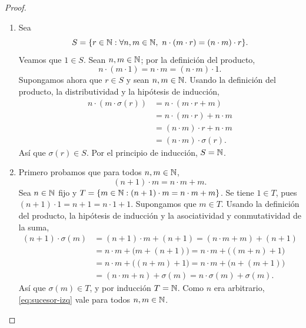 \documentclass[12pt,a4paper]{article}
\begin{document}
    \begin{proof}
        \begin{enumerate}
            \item[a)] Sea
            \begin{equation*}
                S=\{r\in\N : \forall n,m\in\N,\ n\cdot(m\cdot r)=(n\cdot m)\cdot r\}.
            \end{equation*}
            Veamos que $1\in S$. Sean $n,m\in\mathbb{N}$; por la definición del producto,
            \begin{equation*}
                n\cdot(m\cdot1)=n\cdot m=(n\cdot m)\cdot1.
            \end{equation*}
            Supongamos ahora que $r\in S$ y sean $n,m\in\mathbb{N}$. Usando la definición del producto, la distributividad
            y la hipótesis de inducción,
            \begin{align*}
                n\cdot(m\cdot\sigma(r)) &= n\cdot(m\cdot r+m) \\
                &= n\cdot(m\cdot r)+n\cdot m \\
                &= (n\cdot m)\cdot r+n\cdot m \\
                &= (n\cdot m)\cdot\sigma(r).
            \end{align*}
            Así que $\sigma(r)\in S$. Por el principio de inducción, $S=\mathbb{N}$.

            \item[b)] Primero probamos que para todos $n,m\in\mathbb{N}$,
            \begin{equation}\label{eq:sucesor-izq}
                (n+1)\cdot m=n\cdot m+m.
            \end{equation}
            Sea $n\in\mathbb{N}$ fijo y $T=\{m\in\mathbb{N} : (n+1)\cdot m=n\cdot m+m\}$. Se tiene $1\in T$, pues
            $(n+1)\cdot1=n+1=n\cdot1+1$. Supongamos que $m\in T$. Usando la definición del producto, la hipótesis
            de inducción y la asociatividad y conmutatividad de la suma,
            \begin{align*}
                (n+1)\cdot\sigma(m) &= (n+1)\cdot m+(n+1) = (n\cdot m+m)+(n+1) \\
                &= n\cdot m+\big(m+(n+1)\big) = n\cdot m+\big((m+n)+1\big) \\
                &= n\cdot m+\big((n+m)+1\big) = n\cdot m+\big(n+(m+1)\big) \\
                &= (n\cdot m+n)+\sigma(m) = n\cdot\sigma(m)+\sigma(m).
            \end{align*}
            Así que $\sigma(m)\in T$, y por inducción $T=\mathbb{N}$. Como $n$ era arbitrario, \eqref{eq:sucesor-izq} vale
            para todos $n,m\in\mathbb{N}$.


\end{enumerate}
\end{proof}
\end{document}
